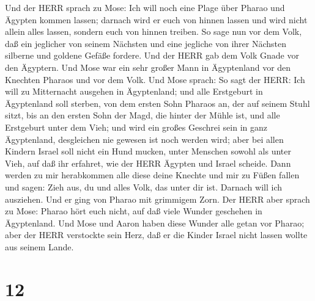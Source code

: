  Und der HERR sprach zu Mose: Ich will noch eine Plage über
Pharao und Ägypten kommen lassen; darnach wird er euch von hinnen lassen
und wird nicht allein alles lassen, sondern euch von hinnen treiben.
 So sage nun vor dem Volk, daß ein jeglicher von seinem
Nächsten und eine jegliche von ihrer Nächsten silberne und goldene
Gefäße fordere.  Und der HERR gab dem Volk Gnade vor den
Ägyptern. Und Mose war ein sehr großer Mann in Ägyptenland vor den
Knechten Pharaos und vor dem Volk.  Und Mose sprach: So sagt
der HERR: Ich will zu Mitternacht ausgehen in Ägyptenland; 
und alle Erstgeburt in Ägyptenland soll sterben, von dem ersten Sohn
Pharaos an, der auf seinem Stuhl sitzt, bis an den ersten Sohn der Magd,
die hinter der Mühle ist, und alle Erstgeburt unter dem Vieh;
 und wird ein großes Geschrei sein in ganz Ägyptenland,
desgleichen nie gewesen ist noch werden wird;  aber bei
allen Kindern Israel soll nicht ein Hund mucken, unter Menschen sowohl
als unter Vieh, auf daß ihr erfahret, wie der HERR Ägypten und Israel
scheide.  Dann werden zu mir herabkommen alle diese deine
Knechte und mir zu Füßen fallen und sagen: Zieh aus, du und alles Volk,
das unter dir ist. Darnach will ich ausziehen. Und er ging von Pharao
mit grimmigem Zorn.  Der HERR aber sprach zu Mose: Pharao
hört euch nicht, auf daß viele Wunder geschehen in Ägyptenland.
 Und Mose und Aaron haben diese Wunder alle getan vor
Pharao; aber der HERR verstockte sein Herz, daß er die Kinder Israel
nicht lassen wollte aus seinem Lande.

\hypertarget{section-11}{%
\section{12}\label{section-11}}

